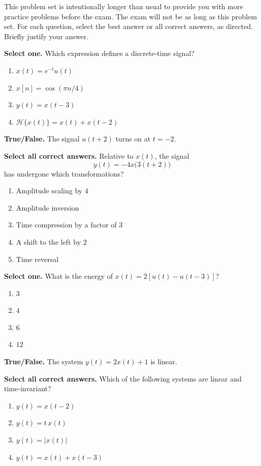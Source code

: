\documentclass{ee102_pset}
\author{\rule{3cm}{0.4pt}} %
\begin{document}
This problem set is intentionally longer than usual to provide you with more practice problems before the exam. The exam will not be as long as this problem set. 
For each question, select the best answer or all correct answers, as directed.
Briefly justify your answer.

\problempart{[3 points]} \textbf{Select one.} Which expression defines a
discrete-time signal?
\begin{enumerate}
    \item $x(t)=e^{-t}u(t)$
    \item $x[n]=\cos(\pi n/4)$
    \item $y(t)=x(t-3)$
    \item $\mathcal{H}\{x(t)\}=x(t)+x(t-2)$
\end{enumerate}

\problempart{[3 points]} \textbf{True/False.} The signal $u(t+2)$ turns on at
$t=-2$.

\problempart{[3 points]} \textbf{Select all correct answers.} Relative to
$x(t)$, the signal
\[
y(t)=-4x\big(3(t+2)\big)
\]
has undergone which transformations?
\begin{enumerate}
    \item Amplitude scaling by $4$
    \item Amplitude inversion
    \item Time compression by a factor of $3$
    \item A shift to the left by $2$
    \item Time reversal
\end{enumerate}

\problempart{[3 points]} \textbf{Select one.} What is the energy of
$x(t)=2[u(t)-u(t-3)]$?
\begin{enumerate}
    \item $3$
    \item $4$
    \item $6$
    \item $12$
\end{enumerate}

\problempart{[3 points]} \textbf{True/False.} The system
$y(t)=2x(t)+1$ is linear.

\problempart{[3 points]} \textbf{Select all correct answers.} Which of the
following systems are linear and time-invariant?
\begin{enumerate}
    \item $y(t)=x(t-2)$
    \item $y(t)=t\,x(t)$
    \item $y(t)=|x(t)|$
    \item $y(t)=x(t)+x(t-3)$
\end{enumerate}
\end{document}
